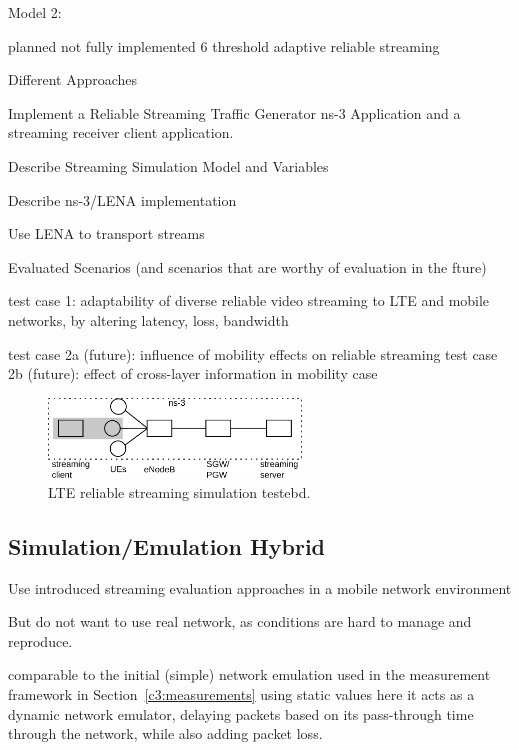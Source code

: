 Model 2:

planned not fully implemented 
6 threshold adaptive reliable streaming



Different Approaches

Implement a Reliable Streaming Traffic Generator ns-3 Application and a streaming receiver client application.

Describe Streaming Simulation Model and Variables

Describe ns-3/LENA implementation

 Use LENA to transport streams


Evaluated Scenarios (and scenarios that are worthy of evaluation in the fture)

 test case 1: adaptability of diverse reliable video streaming to LTE and mobile networks, by altering latency, loss, bandwidth

 test case 2a (future): influence of mobility effects on reliable streaming
 test case 2b (future): effect of cross-layer information in mobility case



\begin{figure}[htb]
\centering
\includegraphics[width=0.6\textwidth]{images/streaming-simulation.pdf}
\caption{\gls{LTE} reliable streaming simulation testebd.}
\label{c5:fig:streaming-simulation}
\end{figure}


\subsection{Simulation/Emulation Hybrid}


Use introduced streaming evaluation approaches in a mobile network environment

But do not want to use real network, as conditions are hard to manage and reproduce.

comparable to the initial (simple) network emulation used in the measurement framework in Section~\ref{c3:measurements} using static values
here it acts as a dynamic network emulator, delaying packets based on its pass-through time through the network, while also adding packet loss.

